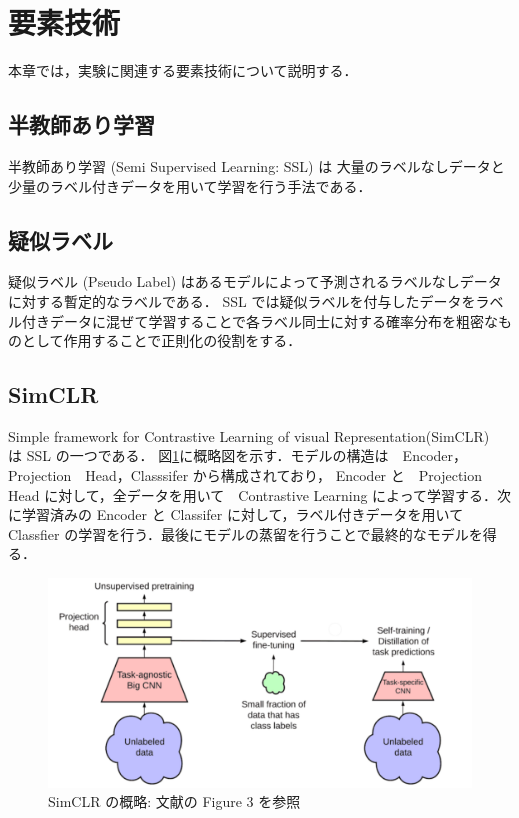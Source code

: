 \newpage
\changeindent{0cm}
\section{要素技術}
\changeindent{2cm}

本章では，実験に関連する要素技術について説明する．

\changeindent{0cm}
\subsection{半教師あり学習}
\changeindent{2cm}
半教師あり学習 (Semi Supervised Learning: SSL)\cite{zhu2005semi} は
大量のラベルなしデータと少量のラベル付きデータを用いて学習を行う手法である．

\changeindent{0cm}
\subsection{疑似ラベル}
\changeindent{2cm}
疑似ラベル (Pseudo Label)\cite{lee2013pseudo} はあるモデルによって予測されるラベルなしデータに対する暫定的なラベルである．
 SSL では疑似ラベルを付与したデータをラベル付きデータに混ぜて学習することで各ラベル同士に対する確率分布を粗密なものとして作用することで正則化の役割をする．
 

\changeindent{0cm}
\subsection{SimCLR}
\changeindent{2cm}
Simple framework for Contrastive Learning of visual Representation(SimCLR)\cite{chen2020simple}　は SSL の一つである．
図\ref{fig:SimCLR}に概略図を示す．モデルの構造は　Encoder，Projection　Head，Classsifer
から構成されており， Encoder と　Projection Head に対して，全データを用いて　Contrastive Learning によって学習する．次に学習済みの Encoder と Classifer に対して，ラベル付きデータを用いて Classfier の学習を行う．最後にモデルの蒸留を行うことで最終的なモデルを得る．
\begin{figure}[h]
	\begin{center}
		\includegraphics[scale=1.0]{./images/SimCLR.png}
		\caption{SimCLR の概略: 文献\cite{chen2020big}の Figure 3 を参照\label{fig:SimCLR}}
	\end{center}
\end{figure}

